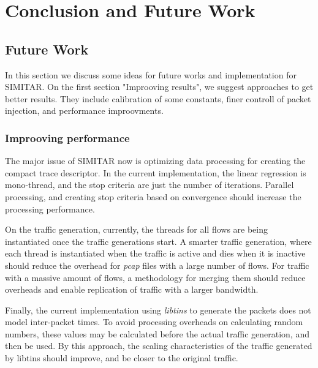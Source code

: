 \chapter{Conclusion and Future Work}\label{ch:conclusion}





\section{Future Work}

In this section we discuss some ideas for future works and implementation for SIMITAR. On the first section "Improoving results", we suggest approaches to get better results. They include calibration of some constants, finer controll of packet injection, and performance improovments. 

\subsection{Improoving performance}


The major issue of SIMITAR now is optimizing data processing for creating the compact trace descriptor. In the current implementation, the linear regression is mono-thread, and the stop criteria are just the number of iterations. Parallel processing, and creating stop criteria based on convergence should increase the processing performance. 

On the traffic generation, currently, the threads for all flows are being instantiated once the traffic generations start. A smarter traffic generation, where each thread is instantiated when the traffic is active and dies when it is inactive should reduce the overhead for \textit{pcap} files with a large number of flows. For traffic with a massive amount of flows, a methodology for merging them should reduce overheads and enable replication of traffic with a larger bandwidth. 

Finally, the current implementation using \textit{libtins} to generate the packets does not model inter-packet times. To avoid processing overheads on calculating random numbers, these values may be calculated before the actual traffic generation, and then be used. By this approach, the scaling characteristics of the traffic generated by libtins should improve, and be closer to the original traffic. 



